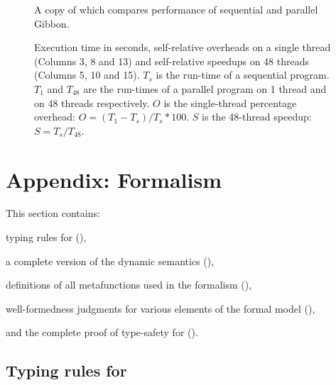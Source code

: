 \begin{figure}[h!]
  
  \caption{
  A copy of  which compares performance of
  sequential and parallel Gibbon.
  }
\end{figure}

\begin{figure}[h!]
  \setlength{\tabcolsep}{0.4em}
    
  \caption{
    Execution time in seconds,
    self-relative overheads on a single thread (Columns 3, 8 and 13)
    and self-relative speedups on 48 threads (Columns 5, 10 and 15).
    $T_s$ is the run-time of a sequential program.
    $T_1$ and $T_{48}$ are the run-times of a parallel program
    on 1 thread and on 48 threads respectively.
    $O$ is the single-thread percentage overhead: $O = (T_1 - T_s) / T_s * 100$.
    $S$ is the 48-thread speedup: $S = T_s / T_{48}$.
  }
  \label{fig:others-benchmark-results}
\end{figure}



\section{Appendix: Formalism}
\label{sec:appendix-formalism}

This section contains:
\begin{enumerate*}[label*=(\arabic*)]
\item typing rules for \ourcalc{} (),
\item a complete version of the dynamic semantics (),
\item definitions of all metafunctions used in the formalism (),
\item well-formedness judgments for various elements of the formal model (),
\item and the complete proof of type-safety for
\rparcalc{} ().
\end{enumerate*}

\subsection{Typing rules for \ourcalc{}}
\label{subsec:appendix-typing-rules}

